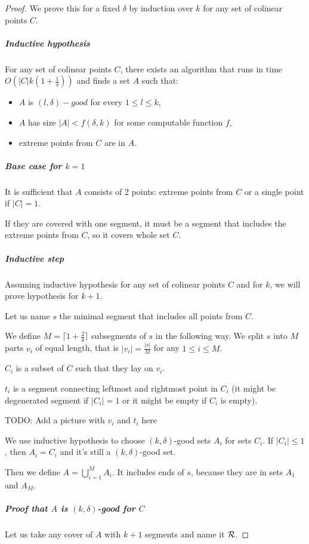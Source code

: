 \begin{proof}
We prove this for a fixed $\delta$
by induction over $k$ for any set of colinear points $C$.

\subparagraph{Inductive hypothesis}
For any set of colinear points $C$,
there exists an algorithm that 
runs in time $O(|C|k(1+\frac{1}{\delta}))$
and finds a set $A$ such that:
\begin{itemize}
\item $A$ is $(l, \delta)-good$ for every $1 \le l \le k$,
\item $A$ has size $|A| < f(\delta, k)$ for some computable function $f$,
\item extreme points from $C$ are in $A$.
\end{itemize}

\subparagraph{Base case for $k = 1$}
It is sufficient that $A$ consists of 2 points: extreme points from $C$
or a single point if $|C| = 1$.

If they are covered with one segment, it must be a segment 
that includes the extreme points from $C$, so it covers whole set $C$.

\subparagraph{Inductive step}
Assuming inductive hypothesis for any set of colinear points $C$
and for $k$, we will prove hypothesis for $k+1$.

Let us name $s$ the minimal segment that includes all points from $C$.

We define $M = \lceil1+\frac{2}{\delta}\rceil$ subsegments of $s$ in the following way.
We split $s$ into $M$ parts 
$v_i$ of equal length, that is $|v_i| = \frac{|s|}{M}$ for any $1 \le i \le M$.

$C_i$ is a subset of $C$ such that they lay on $v_i$.

$t_i$ is a segment connecting leftmost and rightmost point in $C_i$
(it might be degenerated segment if $|C_i| = 1$ or it might be empty
if $C_i$ is empty).

TODO: Add a picture with $v_i$ and $t_i$ here

We use inductive hypothesis to choose $(k, \delta)$-good sets $A_i$
for sets $C_i$. If $|C_i| \le 1$, then $A_i = C_i$
and it's still a $(k, \delta)$-good set.

Then we define $A = \bigcup_{i=1}^{M} A_i$.
It includes ends of $s$, because they are in sets $A_1$ and $A_M$.

\subparagraph{Proof that $A$ is $(k, \delta)$-good for $C$}
Let us take any cover of $A$ with $k+1$ segments and name it $\mathcal{R}$.


\end{proof}
